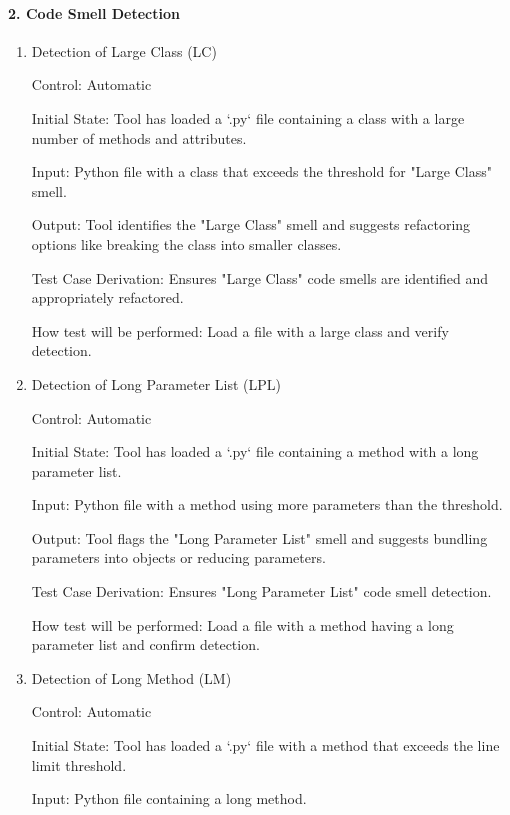 \documentclass[12pt, titlepage]{article}
\begin{document}
\paragraph{2. Code Smell Detection}
\begin{enumerate}
\item{Detection of Large Class (LC)\\}

Control: Automatic
          
Initial State: Tool has loaded a `.py` file containing a class with a large number of methods and attributes.
          
Input: Python file with a class that exceeds the threshold for "Large Class" smell.
          
Output: Tool identifies the "Large Class" smell and suggests refactoring options like breaking the class into smaller classes.

Test Case Derivation: Ensures "Large Class" code smells are identified and appropriately refactored.
          
How test will be performed: Load a file with a large class and verify detection.

\item{Detection of Long Parameter List (LPL)\\}

Control: Automatic
					
Initial State: Tool has loaded a `.py` file containing a method with a long parameter list.
					
Input: Python file with a method using more parameters than the threshold.
					
Output: Tool flags the "Long Parameter List" smell and suggests bundling parameters into objects or reducing parameters.

Test Case Derivation: Ensures "Long Parameter List" code smell detection.
					
How test will be performed: Load a file with a method having a long parameter list and confirm detection.

\item{Detection of Long Method (LM)\\}

Control: Automatic
					
Initial State: Tool has loaded a `.py` file with a method that exceeds the line limit threshold.
					
Input: Python file containing a long method.
					

\end{enumerate}
\end{document}

